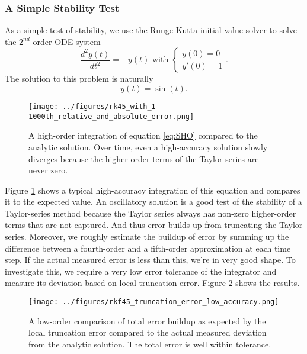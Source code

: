 \documentclass[]{article}
\begin{document}
\subsubsection{A Simple Stability Test}
\label{subsubsec:simple:stability}

As a simple test of stability, we use the Runge-Kutta initial-value
solver to solve the $2^{nd}$-order ODE system
\begin{equation}
  \label{eq:SHO}
  \frac{d^2 y(t)}{d t^2} = -y(t)\text{ with } \begin{cases}y(0)=0\\y'(0)=1\end{cases}.
\end{equation}
The solution to this problem is naturally 
\begin{equation}
  \label{eq:SHO:solution}
  y(t) = \sin(t).
\end{equation}

\begin{figure}[htb!]
  \centering
  \texttt{[image: ../figures/rk45\_with\_1-1000th\_relative\_and\_absolute\_error.png]}
  \caption[A simple stability test]{A high-order integration of
    equation \eqref{eq:SHO} compared to the analytic solution. Over
    time, even a high-accuracy solution slowly diverges because the
    higher-order terms of the Taylor series are never zero.}
  \label{fig:SHO:1}
\end{figure}

Figure \ref{fig:SHO:1} shows a typical high-accuracy integration of
this equation and compares it to the expected value. An oscillatory
solution is a good test of the stability of a Taylor-series method
because the Taylor series always has non-zero higher-order terms that
are not captured. And thus error builds up from truncating the Taylor
series. Moreover, we roughly estimate the buildup of error by summing
up the difference between a fourth-order and a fifth-order
approximation at each time step. If the actual measured error is less
than this, we're in very good shape. To investigate this, we require a
very low error tolerance of the integrator and measure its deviation
based on local truncation error. Figure \ref{fig:SHO:2} shows the
results.

\begin{figure}[htb!]
  \begin{center}
    \leavevmode
    \texttt{[image: ../figures/rkf45\_truncation\_error\_low\_accuracy.png]}
    \caption[A simple stability test]{A low-order comparison of total
      error buildup as expected by the local truncation error compared
      to the actual measured deviation from the analytic solution. The
      total error is well within tolerance.}
  \end{center}
  \label{fig:SHO:2}
\end{figure}
\end{document}
